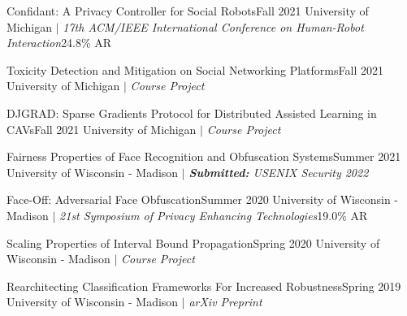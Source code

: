 
    \CVSubheading
      {{Confidant: A Privacy Controller for Social Robots}\cite{HRIPrivacy}}{Fall 2021}
      {{University of Michigan} $|$ \emph{\small{17th ACM/IEEE International Conference on Human-Robot Interaction}}}{24.8\% AR}
      
    \CVSubheading
      {Toxicity Detection and Mitigation on Social Networking Platforms}{Fall 2021}
      {{University of Michigan} $|$ \emph{\small{Course Project}}}{}
      
    \CVSubheading
      {DJGRAD: Sparse Gradients Protocol for Distributed Assisted Learning in CAVs}{Fall 2021}
      {{University of Michigan} $|$ \emph{\small{Course Project}}}{}
      
    \CVSubheading
      {{Fairness Properties of Face Recognition and Obfuscation Systems}\cite{Fairness}}{Summer 2021}
      {{University of Wisconsin - Madison} $|$ \emph{\small{\textbf{Submitted:} USENIX Security 2022}}}{}

    \CVSubheading
      {{Face-Off: Adversarial Face Obfuscation}\cite{FaceOff}}{Summer 2020}
      {{University of Wisconsin - Madison} $|$ \emph{\small{21st Symposium of Privacy Enhancing Technologies}}}{19.0\% AR}

    \CVSubheading
      {Scaling Properties of Interval Bound Propagation}{Spring 2020}
      {{University of Wisconsin - Madison} $|$ \emph{\small{Course Project}}}{}

    \CVSubheading
      {{Rearchitecting Classification Frameworks For Increased Robustness}\cite{Robustness}}{Spring 2019}
      {{University of Wisconsin - Madison} $|$ \emph{\small{arXiv Preprint}}}{}

  \CVSubHeadingListEnd